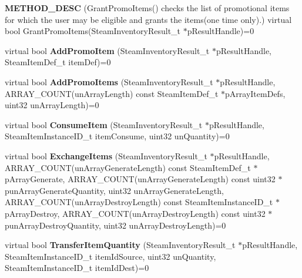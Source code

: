 \begin{DoxyCompactItemize}
{\bfseries M\+E\+T\+H\+O\+D\+\_\+\+D\+E\+SC} (Grant\+Promo\+Items() checks the list of promotional items for which the user may be eligible and grants the items(one time only).) virtual bool Grant\+Promo\+Items(Steam\+Inventory\+Result\+\_\+t $\ast$p\+Result\+Handle)=0
\item 
\mbox{\label{class_i_steam_inventory_ae5625ecc3c2e08f563231a4290f35dd8}} 
virtual bool {\bfseries Add\+Promo\+Item} (Steam\+Inventory\+Result\+\_\+t $\ast$p\+Result\+Handle, Steam\+Item\+Def\+\_\+t item\+Def)=0
\item 
\mbox{\label{class_i_steam_inventory_a608aa5b19aa356579a1f3e6540e6a317}} 
virtual bool {\bfseries Add\+Promo\+Items} (Steam\+Inventory\+Result\+\_\+t $\ast$p\+Result\+Handle, A\+R\+R\+A\+Y\+\_\+\+C\+O\+U\+NT(un\+Array\+Length) const Steam\+Item\+Def\+\_\+t $\ast$p\+Array\+Item\+Defs, uint32 un\+Array\+Length)=0
\item 
\mbox{\label{class_i_steam_inventory_a00be78e3a87ded4d32568e67e20d2c52}} 
virtual bool {\bfseries Consume\+Item} (Steam\+Inventory\+Result\+\_\+t $\ast$p\+Result\+Handle, Steam\+Item\+Instance\+I\+D\+\_\+t item\+Consume, uint32 un\+Quantity)=0
\item 
\mbox{\label{class_i_steam_inventory_a0b03243926fd83d436275b640ae1965e}} 
virtual bool {\bfseries Exchange\+Items} (Steam\+Inventory\+Result\+\_\+t $\ast$p\+Result\+Handle, A\+R\+R\+A\+Y\+\_\+\+C\+O\+U\+NT(un\+Array\+Generate\+Length) const Steam\+Item\+Def\+\_\+t $\ast$p\+Array\+Generate, A\+R\+R\+A\+Y\+\_\+\+C\+O\+U\+NT(un\+Array\+Generate\+Length) const uint32 $\ast$pun\+Array\+Generate\+Quantity, uint32 un\+Array\+Generate\+Length, A\+R\+R\+A\+Y\+\_\+\+C\+O\+U\+NT(un\+Array\+Destroy\+Length) const Steam\+Item\+Instance\+I\+D\+\_\+t $\ast$p\+Array\+Destroy, A\+R\+R\+A\+Y\+\_\+\+C\+O\+U\+NT(un\+Array\+Destroy\+Length) const uint32 $\ast$pun\+Array\+Destroy\+Quantity, uint32 un\+Array\+Destroy\+Length)=0
\item 
\mbox{\label{class_i_steam_inventory_ad0a8c94ef54e9199d752ffd91c0d671b}} 
virtual bool {\bfseries Transfer\+Item\+Quantity} (Steam\+Inventory\+Result\+\_\+t $\ast$p\+Result\+Handle, Steam\+Item\+Instance\+I\+D\+\_\+t item\+Id\+Source, uint32 un\+Quantity, Steam\+Item\+Instance\+I\+D\+\_\+t item\+Id\+Dest)=0

\end{DoxyCompactItemize}
